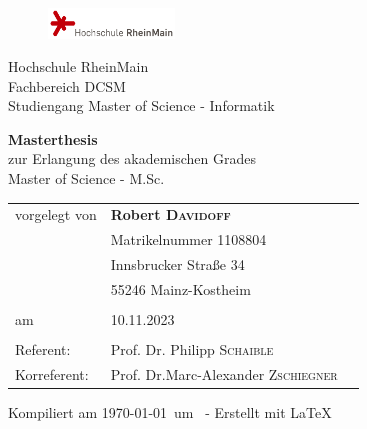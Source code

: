\pagestyle{empty} %

\begin{figure}[t]
	\flushright
	\includegraphics[width=0.3\textwidth]{media/logo_hsrm}
\end{figure}


\begin{center}
Hochschule RheinMain \\
Fachbereich DCSM \\
Studiengang Master of Science - Informatik

\vspace{30 pt}

{\Large \textbf{Masterthesis}} \\
zur Erlangung des akademischen Grades \\ 
Master of Science - M.Sc.

\vspace{50 pt}

\begin{spacing}{1.2}
\LARGE \textbf{\thetitle}
\end{spacing}
%
\end{center}

\vfill %

%
\begin{small}
\begin{tabular}[h]{p{4cm}l l}
    vorgelegt von        & \textbf{Robert \textsc{Davidoff}} \\ 
                         & Matrikelnummer 1108804 \\
                         & Innsbrucker Straße 34 \\
                         & 55246 Mainz-Kostheim \\
                         & \\
    am                   & 10.11.2023 \\
                         & \\
    Referent:            & Prof. Dr. Philipp \textsc{Schaible}\\
    Korreferent:         & Prof. Dr.Marc-Alexander \textsc{Zschiegner}\\
\end{tabular}
%
\vspace{15pt}
%
\end{small}
%
\vspace{15pt}
%
\begin{center}
	\textcolor[gray]{0.4}{\tiny Kompiliert am \today ~um \currenttime ~- Erstellt mit \LaTeX}
\end{center}
%
\restoregeometry %